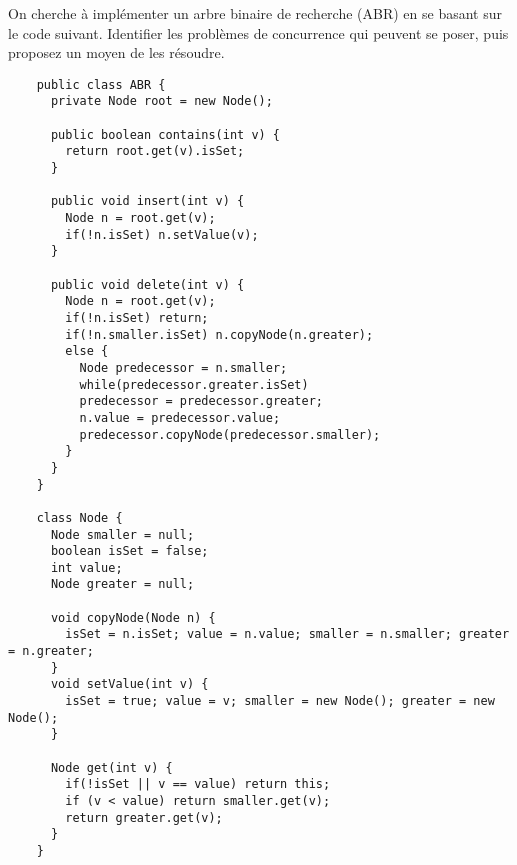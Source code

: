 
\begingroup

\begin{exercice}
  \label{exo:blocking/tree}

  On cherche à implémenter un arbre binaire de recherche (ABR) en se basant sur le code suivant.
  Identifier les problèmes de concurrence qui peuvent se poser, puis proposez un moyen de les résoudre.
 
  \begin{lstlisting}
    public class ABR {
      private Node root = new Node();
      
      public boolean contains(int v) {
        return root.get(v).isSet;
      }
      
      public void insert(int v) {
        Node n = root.get(v);
        if(!n.isSet) n.setValue(v);
      }
      
      public void delete(int v) {
        Node n = root.get(v);
        if(!n.isSet) return;
        if(!n.smaller.isSet) n.copyNode(n.greater);
        else {
          Node predecessor = n.smaller;
          while(predecessor.greater.isSet) 
          predecessor = predecessor.greater;
          n.value = predecessor.value;
          predecessor.copyNode(predecessor.smaller);
        }
      }
    }
    
    class Node {
      Node smaller = null;
      boolean isSet = false;
      int value;
      Node greater = null;
      
      void copyNode(Node n) { 
        isSet = n.isSet; value = n.value; smaller = n.smaller; greater = n.greater;
      }
      void setValue(int v) {
        isSet = true; value = v; smaller = new Node(); greater = new Node();
      }
      
      Node get(int v) {
        if(!isSet || v == value) return this;
        if (v < value) return smaller.get(v);
        return greater.get(v);
      }
    }
  \end{lstlisting}

\end{exercice}

\endgroup
\endinput

